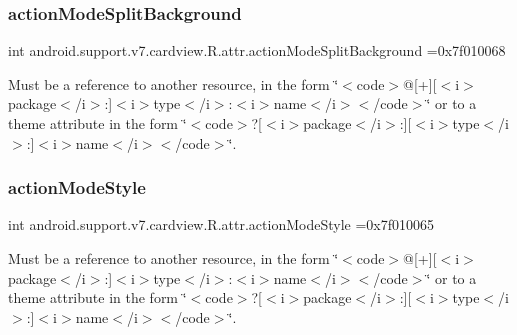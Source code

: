 \subsubsection{\texorpdfstring{action\+Mode\+Split\+Background}{actionModeSplitBackground}}
{\footnotesize\ttfamily int android.\+support.\+v7.\+cardview.\+R.\+attr.\+action\+Mode\+Split\+Background =0x7f010068\hspace{0.3cm}{\ttfamily [static]}}

Must be a reference to another resource, in the form \char`\"{}$<$code$>$@\mbox{[}+\mbox{]}\mbox{[}$<$i$>$package$<$/i$>$\+:\mbox{]}$<$i$>$type$<$/i$>$\+:$<$i$>$name$<$/i$>$$<$/code$>$\char`\"{} or to a theme attribute in the form \char`\"{}$<$code$>$?\mbox{[}$<$i$>$package$<$/i$>$\+:\mbox{]}\mbox{[}$<$i$>$type$<$/i$>$\+:\mbox{]}$<$i$>$name$<$/i$>$$<$/code$>$\char`\"{}. \mbox{\label{classandroid_1_1support_1_1v7_1_1cardview_1_1R_1_1attr_acd95c50299a613cf031557f3da7bc3ea}} 
\subsubsection{\texorpdfstring{action\+Mode\+Style}{actionModeStyle}}
{\footnotesize\ttfamily int android.\+support.\+v7.\+cardview.\+R.\+attr.\+action\+Mode\+Style =0x7f010065\hspace{0.3cm}{\ttfamily [static]}}

Must be a reference to another resource, in the form \char`\"{}$<$code$>$@\mbox{[}+\mbox{]}\mbox{[}$<$i$>$package$<$/i$>$\+:\mbox{]}$<$i$>$type$<$/i$>$\+:$<$i$>$name$<$/i$>$$<$/code$>$\char`\"{} or to a theme attribute in the form \char`\"{}$<$code$>$?\mbox{[}$<$i$>$package$<$/i$>$\+:\mbox{]}\mbox{[}$<$i$>$type$<$/i$>$\+:\mbox{]}$<$i$>$name$<$/i$>$$<$/code$>$\char`\"{}. \mbox{\label{classandroid_1_1support_1_1v7_1_1cardview_1_1R_1_1attr_a97da397e6e57874c77134e0107d32083}} 
